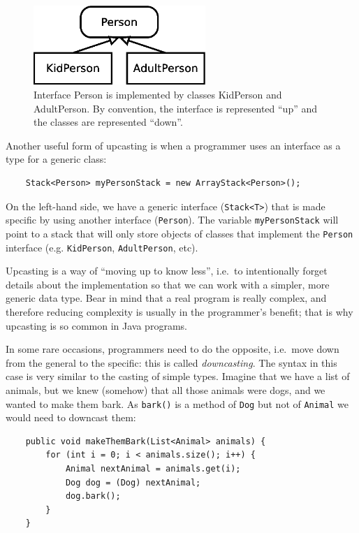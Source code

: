 \begin{figure}[hbtp]
  \centering
  \includegraphics[height=3cm]{gfx/class_diagram-person}
  \caption{Interface Person is implemented by classes KidPerson and
    AdultPerson. By convention, the interface is represented ``up'' and
    the classes are represented ``down''.} 
  \label{fig:updown}
\end{figure}

Another useful form of upcasting is when a programmer uses an
interface as a type for a generic class: 

\begin{verbatim}
    Stack<Person> myPersonStack = new ArrayStack<Person>();
\end{verbatim}

On the left-hand side, we have a generic interface (\verb+Stack<T>+) that is made
specific by using another interface (\verb+Person+). The variable
\verb+myPersonStack+ will point to a stack that will only store
objects of classes that implement the \verb+Person+ interface
(e.g. \verb+KidPerson+, \verb+AdultPerson+, etc). 

Upcasting is a way of ``moving up to know less'', i.e.~to
intentionally forget details about the implementation so that we can
work with a simpler, more generic data type. 
Bear in mind that a real program is really complex, and therefore
reducing complexity is usually in the programmer's benefit; that
is why upcasting is so common in Java programs. 

In some rare occasions,
programmers need to do the opposite, i.e.~move down from the general
to the specific: this is called \emph{downcasting}. The syntax in this
case is very similar to the casting of simple types. Imagine that we
have a list of animals, but we knew (somehow) that all those animals
were dogs, and we wanted to make them bark. As \verb+bark()+ is a
method of \verb+Dog+ but not of \verb+Animal+ we would need to
downcast them: 

\begin{verbatim}
    public void makeThemBark(List<Animal> animals) {
        for (int i = 0; i < animals.size(); i++) {
            Animal nextAnimal = animals.get(i);
            Dog dog = (Dog) nextAnimal;
            dog.bark();
        }
    }
\end{verbatim}

